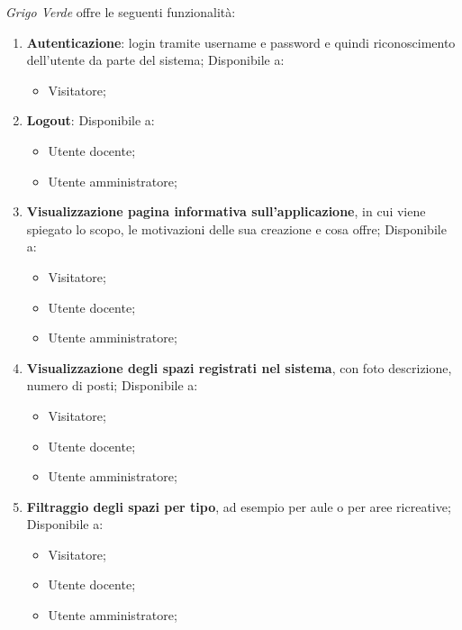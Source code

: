 \textit{Grigo Verde} offre le seguenti funzionalità:
\begin{enumerate}
	\item \textbf{Autenticazione}: login tramite username e password e quindi
	      riconoscimento dell'utente da parte del sistema; Disponibile a:
	      \begin{itemize}
		      \item Visitatore;
	      \end{itemize}

	\item \textbf{Logout}: Disponibile a:
	      \begin{itemize}
		      \item Utente docente;
		      \item Utente amministratore;
	      \end{itemize}

	\item \textbf{Visualizzazione pagina informativa sull'applicazione}, in cui
	      viene spiegato lo scopo, le motivazioni delle sua creazione e cosa
	      offre;
	      Disponibile a:
	      \begin{itemize}
		      \item Visitatore;
		      \item Utente docente;
		      \item Utente amministratore;
	      \end{itemize}

	\item \textbf{Visualizzazione degli spazi registrati nel sistema}, con foto
	      descrizione, numero di posti; Disponibile a:
	      \begin{itemize}
		      \item Visitatore;
		      \item Utente docente;
		      \item Utente amministratore;
	      \end{itemize}

	\item \textbf{Filtraggio degli spazi per tipo}, ad esempio per aule o per
	      aree ricreative; Disponibile a:
	      \begin{itemize}
		      \item Visitatore;
		      \item Utente docente;
		      \item Utente amministratore;
	      \end{itemize}


\end{enumerate}
